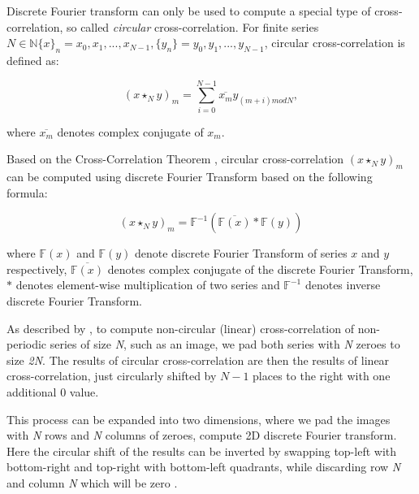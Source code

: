 Discrete Fourier transform can only be used to compute a special type of cross-correlation, so called \textit{circular} cross-correlation.
For finite series $N \in \mathbb{N} \{x\}_n = x_0, x_1, ..., x_{N-1}, \{y_n\} = y_0, y_1, ..., y_{N-1}$, circular cross-correlation is defined as:

\[
(x \star_N y)_m = \sum_{i=0}^{N-1} \overline{x_m} y_{(m + i) mod N},
\]

where $\overline{x_m}$ denotes complex conjugate of $x_m$.


Based on the Cross-Correlation Theorem \citep{thesis:wang}, circular cross-correlation $(x \star_N y)_m$ can be computed using discrete Fourier Transform based on the following formula:

\[
(x \star_N y)_m = \mathbb{F}^{-1}(\overline{\mathbb{F}(x)}*\mathbb{F}(y))
\]

where $\mathbb{F}(x)$ and $\mathbb{F}(y)$ denote discrete Fourier Transform of series $x$ and $y$ respectively, $\overline{\mathbb{F}(x)}$ denotes complex conjugate of the discrete Fourier Transform, $*$ denotes element-wise multiplication of two series and $\mathbb{F}^{-1}$ denotes inverse discrete Fourier Transform.

As described by \citep{misko}, to compute non-circular (linear) cross-correlation of non-periodic series of size \textit{N}, such as an image, we pad both series with \textit{N} zeroes to size \textit{2N}. The results of circular cross-correlation are then the results of linear cross-correlation, just circularly shifted by $N-1$ places to the right with one additional 0 value. 


This process can be expanded into two dimensions, where we pad the images with \textit{N} rows and \textit{N} columns of zeroes, compute 2D discrete Fourier transform. Here the circular shift of the results can be inverted by swapping top-left with bottom-right and top-right with bottom-left quadrants, while discarding row \textit{N} and column \textit{N} which will be zero \citep{misko}. 



